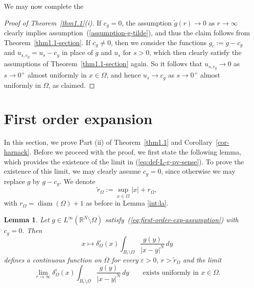 \documentclass[notitlepage,11pt,reqno]{amsart}
\newtheorem{lemma}[theorem]{Lemma}
\theoremstyle{definition}
\numberwithin{equation}{section}
\newcommand{\eps}{{\varepsilon}}
\newcommand{\R}{\mathds{R}}
\DeclareMathOperator*{\diam}{diam}
\begin{document}
We may now complete the

\begin{proof}[Proof of Theorem~\ref{thm1.1}(i)]
  If $c_g = 0$, the assumption $\tilde g(r) \to 0$ as $r \to \infty$ clearly implies assumption~(\ref{assumption-g-tilde}), and thus the claim follows from Theorem~\ref{thm1.1-section}. If $c_g \not = 0$, then we consider the functions $g_c:= g -c_g$ and $u_{s,c_g} = u_s -c_g$ in place of $g$ and $u_s$ for $s>0$, which then clearly satisfy the assumptions of Theorem~\ref{thm1.1-section} again. So it follows that $u_{s,c_g} \to 0$ as $s \to 0^+$ almost uniformly in $x \in \Omega$, and hence $u_s \to c_g$ as $s \to 0^+$ almost uniformly in $\Omega$, as claimed.
 \end{proof} 

\section{First order expansion}\label{diff at s=0}
In this section, we prove Part (ii) of Theorem~\ref{thm1.1} and Corollary~\ref{cor-harnack}. Before we proceed with the proof, we first state the following lemma, which provides the existence of the limit in (\ref{eq:def-L-g-pv-sense}). To prove the existence of this limit, we may clearly assume $c_g =0$, since otherwise we may replace $g$ by $g-c_g$.  We denote 
\[
\tilde r_\Omega:= \sup_{x \in \Omega}|x|+r_{\Omega},
\]
with $r_{\Omega}=\diam(\Omega)+1$ as before in Lemma \ref{int:la}.
\begin{lemma}
  \label{regarding-def-L-g-pv-sense}
  Let $g \in L^\infty(\R^N \setminus \Omega)$ satisfy~(\ref{eq:first-order-exp-assumption}) with $c_g=0$. Then 
  \begin{equation}
    \label{continuous-function-g}
 x \mapsto \delta_\Omega^\eps(x) \int_{B_r \setminus \Omega}\frac{g(y)}{|x-y|^N}\,dy   
  \end{equation}
  defines a continuous function on $\overline{\Omega}$ for every $\eps>0$, $r>\tilde r_\Omega$
and the limit 
    \begin{equation}
    \label{eq:remainder-g-est}
 \lim_{r \to \infty} \delta_\Omega^\eps(x) \int_{B_r \setminus \Omega}\frac{g(y)}{|x-y|^N}\,dy \qquad \text{exists uniformly in $x \in \Omega$.}
  \end{equation}
  \end{lemma}
\end{document}

